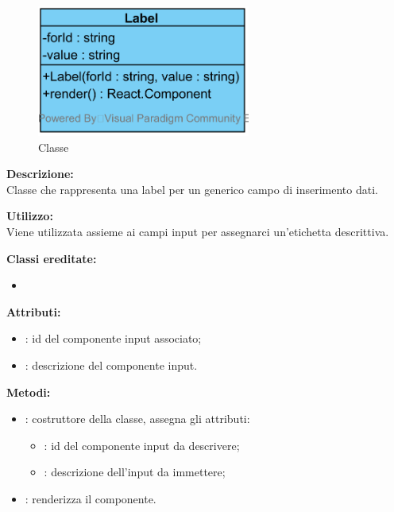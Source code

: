 \paragraph[::Label]{\class}\mbox{}\\ \label{\class}
\begin{figure}[H]
	\centering
	\includegraphics[width=7cm]{./diagrammi/framework/view/gui/label.png}
	\caption{Classe \class}
\end{figure}
\textbf{Descrizione:}\\
Classe che rappresenta una label per un generico campo di inserimento dati.

\textbf{Utilizzo:}\\
Viene utilizzata assieme ai campi input per assegnarci un'etichetta descrittiva.

\textbf{Classi ereditate:}
\begin{itemize}
	\item {}
\end{itemize}


\textbf{Attributi:}
\begin{itemize}
	\item {}: id del componente input associato;
	\item {}: descrizione del componente input.
\end{itemize}

\textbf{Metodi:}
\begin{itemize}
	\item {}: costruttore della classe, assegna gli attributi:
	\begin{itemize}
		\item {}: id del componente input da descrivere;
		\item {}: descrizione dell'input da immettere;
	\end{itemize}
	\item {}: renderizza il componente.
\end{itemize}

